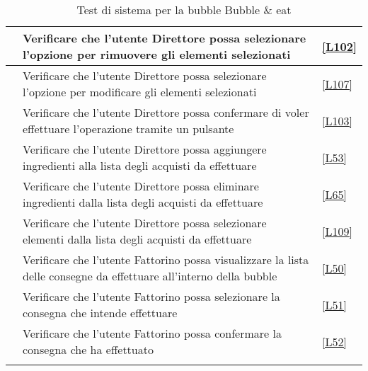 \begin{longtable}{|P{5cm}|P{5cm}|P{5cm}|}
	\hline {} & Verificare che l'utente Direttore possa selezionare l'opzione per rimuovere gli elementi selezionati & \ref{L102} \\
	\hline {} & Verificare che l'utente Direttore possa selezionare l'opzione per modificare gli elementi selezionati & \ref{L107} \\
	\hline {} & Verificare che l'utente Direttore possa confermare di voler effettuare l'operazione tramite un pulsante & \ref{L103} \\
	\hline {} & Verificare che l'utente Direttore possa aggiungere ingredienti alla lista degli acquisti da effettuare & \ref{L53}\\
	\hline {} & Verificare che l'utente Direttore possa eliminare ingredienti dalla lista degli acquisti da effettuare & \ref{L65} \\
	\hline {} & Verificare che l'utente Direttore possa selezionare elementi dalla lista degli acquisti da effettuare & \ref{L109} \\
	\hline {} & Verificare che l'utente Fattorino possa visualizzare la lista delle consegne da effettuare all’interno della bubble & \ref{L50}  \\
	\hline {} & Verificare che l'utente Fattorino possa selezionare la consegna che intende effettuare & \ref{L51} \\
	\hline {} & Verificare che l'utente Fattorino possa confermare la consegna che ha effettuato & \ref{L52} \\
	\hline
	\caption{Test di sistema per la bubble Bubble \& eat}
\end{longtable}

